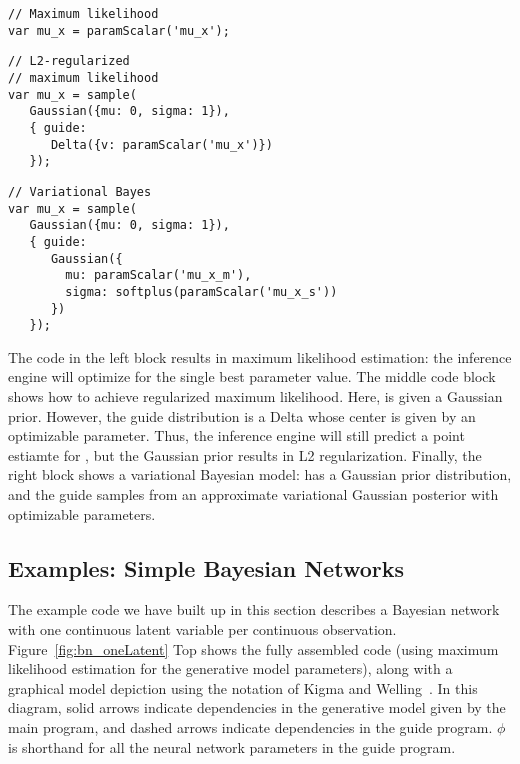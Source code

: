 \begin{minipage}{0.33\linewidth}
\begin{lstlisting}[style=learnableModels]
// Maximum likelihood
var mu_x = paramScalar('mu_x');
\end{lstlisting}
\end{minipage}
%
\hspace{-2em}
%
\begin{minipage}{0.33\linewidth}
\begin{lstlisting}[style=learnableModels]
// L2-regularized
// maximum likelihood
var mu_x = sample(
   Gaussian({mu: 0, sigma: 1}),
   { guide:
      Delta({v: paramScalar('mu_x')})
   });
\end{lstlisting}
\end{minipage}
%
\hspace{-1em}
%
\begin{minipage}{0.33\linewidth}
\begin{lstlisting}[style=learnableModels]
// Variational Bayes
var mu_x = sample(
   Gaussian({mu: 0, sigma: 1}),
   { guide:
      Gaussian({
        mu: paramScalar('mu_x_m'),
        sigma: softplus(paramScalar('mu_x_s'))
      })
   });
\end{lstlisting}
\end{minipage}

The code in the left block results in maximum likelihood estimation: the inference engine will optimize for the single best parameter value.
The middle code block shows how to achieve regularized maximum likelihood. Here,  is given a Gaussian prior. However, the guide distribution is a Delta whose center is given by an optimizable parameter. Thus, the inference engine will still predict a point estiamte for , but the Gaussian prior results in L2 regularization.
Finally, the right block shows a variational Bayesian model:  has a Gaussian prior distribution, and the guide samples  from an approximate variational Gaussian posterior with optimizable parameters.


\subsection{Examples: Simple Bayesian Networks}

The example code we have built up in this section describes a Bayesian network with one continuous latent variable per continuous observation. Figure~\ref{fig:bn_oneLatent} Top shows the fully assembled code (using maximum likelihood estimation for the generative model parameters), along with a graphical model depiction using the notation of Kigma and Welling~\cite{AEVB}. In this diagram, solid arrows indicate dependencies in the generative model given by the main program, and dashed arrows indicate dependencies in the guide program. $\phi$ is shorthand for all the neural network parameters in the guide program.


